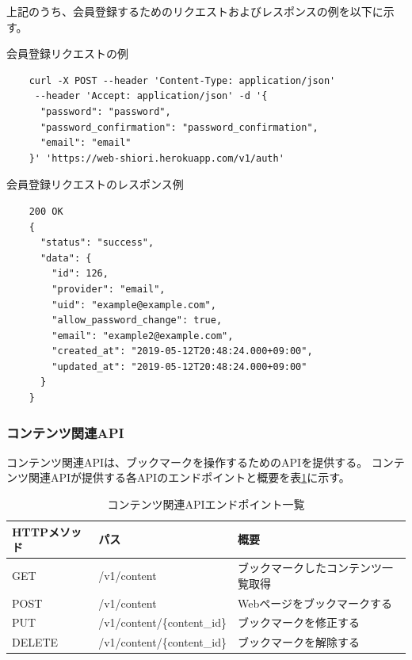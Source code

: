 上記のうち、会員登録するためのリクエストおよびレスポンスの例を以下に示す。

\begin{itembox}[l]{会員登録リクエストの例}
  \label{auth-request-curl}
  \begin{verbatim}
    curl -X POST --header 'Content-Type: application/json'
     --header 'Accept: application/json' -d '{
      "password": "password",
      "password_confirmation": "password_confirmation",
      "email": "email"
    }' 'https://web-shiori.herokuapp.com/v1/auth'
  \end{verbatim}
\end{itembox}

\begin{itembox}[l]{会員登録リクエストのレスポンス例}
  \label{auth-response-json}
  \begin{verbatim}
    200 OK
    {
      "status": "success",
      "data": {
        "id": 126,
        "provider": "email",
        "uid": "example@example.com",
        "allow_password_change": true,
        "email": "example2@example.com",
        "created_at": "2019-05-12T20:48:24.000+09:00",
        "updated_at": "2019-05-12T20:48:24.000+09:00"
      }
    }
  \end{verbatim}
\end{itembox}

\subsubsection{コンテンツ関連API}
コンテンツ関連APIは、ブックマークを操作するためのAPIを提供する。
コンテンツ関連APIが提供する各APIのエンドポイントと概要を表\ref{tb:design-content-api}に示す。

\begin{table}[htbp]
  \label{tb:design-content-api}
  \caption{コンテンツ関連APIエンドポイント一覧}
  \begin{center}
    \begin{tabular}{|l|l|l|}
      \hline
      HTTPメソッド & パス & 概要 \\\hline\hline
      GET & /v1/content & ブックマークしたコンテンツ一覧取得 \\\hline
      POST & /v1/content & Webページをブックマークする \\\hline
      PUT & /v1/content/\{content\_id\} & ブックマークを修正する \\\hline
      DELETE & /v1/content/\{content\_id\} & ブックマークを解除する \\\hline
    \end{tabular}
  \end{center}
\end{table}

